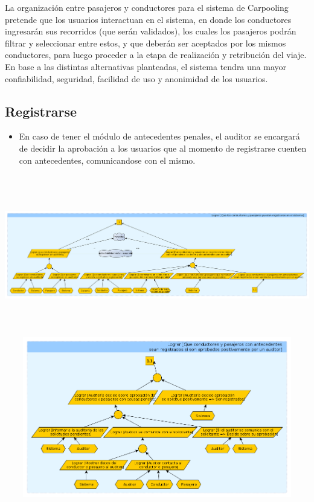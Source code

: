 \documentclass[a4paper,titlepage,10pt]{article}
\begin{document}
La organizaci\'on entre pasajeros y conductores para el sistema de Carpooling pretende que los usuarios interactuan en el sistema, en donde los conductores ingresarán sus recorridos (que serán validados), los 
cuales los pasajeros podrán filtrar y seleccionar entre estos, y que deberán ser aceptados por los mismos conductores, para luego proceder a la etapa de realizaci\'on y retribuci\'on del viaje. En base a las 
distintas alternativas planteadas, el sistema tendra una mayor confiabilidad, seguridad, facilidad de uso y anonimidad de los usuarios.

\subsection{Registrarse}
\begin{itemize}
\item En caso de tener el m\'odulo de antecedentes penales, el auditor se encargará de decidir la aprobaci\'on a los usuarios que al momento de registrarse cuenten con antecedentes, comunicandose con el mismo.
\end{itemize}
\includegraphics[height=7cm,width=19.5cm]{imagenes/Registrarse.png}
\includegraphics[height=7cm,width=19.5cm]{imagenes/Registrarsea.png}
\end{document}
